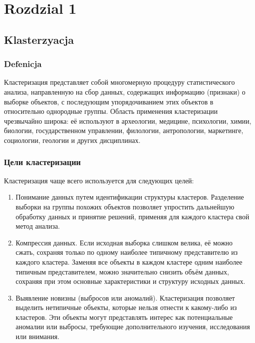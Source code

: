 \chapter{Rozdzial 1}

\section{Klasterzyacja}

	\subsection{Defenicja}
		Кластеризация представляет собой многомерную процедуру статистического анализа, направленную на сбор данных, содержащих информацию (признаки) о выборке объектов, с последующим упорядочиванием этих объектов в относительно однородные группы. Область применения кластеризации чрезвычайно широка: её используют в археологии, медицине, психологии, химии, биологии, государственном управлении, филологии, антропологии, маркетинге, социологии, геологии и других дисциплинах.
	
	\subsection{Цели кластеризации}
		Кластеризация чаще всего используется для следующих целей:
		\begin{enumerate}
			\item Понимание данных путем идентификации структуры кластеров. Разделение выборки на группы похожих 	объектов позволяет упростить дальнейшую обработку данных и принятие решений, применяя для каждого кластера свой метод анализа.
			\item Компрессия данных. Если исходная выборка слишком велика, её можно сжать, сохраняя только по одному наиболее типичному представителю из каждого кластера. Заменяя все объекты в каждом кластере одним наиболее типичным представителем, можно значительно снизить объём данных, сохраняя при этом основные характеристики и структуру исходных данных.
			\item Выявление новизны (выбросов или аномалий). Кластеризация позволяет выделить нетипичные объекты, которые нельзя отнести к какому-либо из кластеров. Эти объекты могут представлять интерес как потенциальные аномалии или выбросы, требующие дополнительного изучения, исследования или внимания.
		\end{enumerate}
	
	
